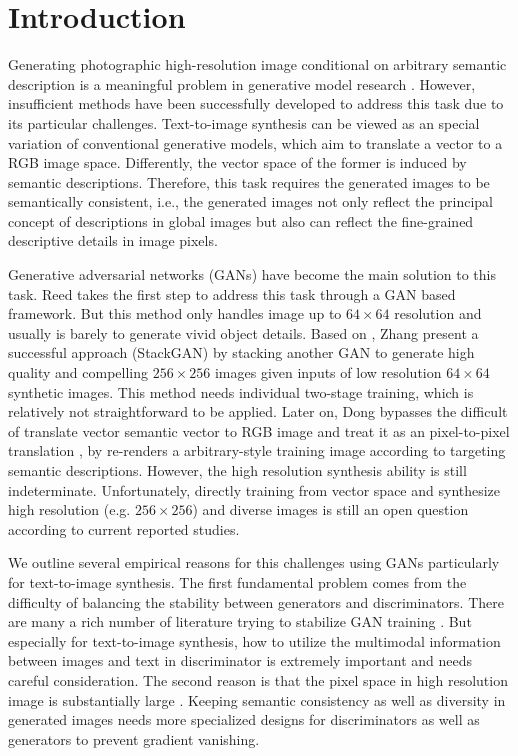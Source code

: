\documentclass[10pt,twocolumn,letterpaper]{article}
\begin{document}
\section{Introduction}
Generating photographic high-resolution image conditional on arbitrary semantic description is a meaningful problem in generative model research \cite{reed2016generative}. However, insufficient methods have been successfully developed to address this task due to its particular challenges. Text-to-image synthesis can be viewed as an special variation of conventional generative models, which aim to translate a vector to a RGB image space.  Differently, the vector space of the former is induced by semantic descriptions. Therefore, this task requires the generated images to be semantically consistent, i.e., the generated images not only reflect the principal concept of descriptions in global images but also can reflect the fine-grained descriptive details in image pixels. 

Generative adversarial networks (GANs) have become the main solution to this task. 
Reed \etal \cite{reed2016generative} takes the first step to address this task through a GAN based framework. But this method only handles image up to $64{\times}64$ resolution and usually is barely to generate vivid object details.
Based on \cite{reed2016generative}, Zhang \etal \cite{han2017stackgan} present a successful approach (StackGAN) by stacking another GAN to generate high quality and compelling $256{\times}256$ images given inputs of low resolution $64{\times}64$ synthetic images. This method needs individual two-stage training, which is relatively not straightforward to be applied. Later on, Dong \etal \cite{dong2017semantic} 
bypasses the difficult of translate vector semantic vector to RGB image and treat it as an pixel-to-pixel translation \cite{isola2016image}, by re-renders a arbitrary-style training image according to targeting semantic descriptions. However, the high resolution synthesis ability is still indeterminate. 
Unfortunately, directly training from vector space and synthesize high resolution (e.g. $256{\times}256$) and diverse images is still an open question according to current reported studies. 

We outline several empirical reasons for this challenges using GANs particularly for text-to-image synthesis. The first fundamental problem comes from the difficulty of balancing the stability between generators and discriminators. There are many a rich number of literature trying to stabilize GAN training \cite{salimans2016improved}. But especially for text-to-image synthesis, how to utilize the multimodal information between images and text in discriminator is extremely important and needs careful consideration. The second reason is that the pixel space in high resolution image is substantially large \cite{han2017stackgan}. Keeping semantic consistency as well as diversity in generated images needs more specialized designs for discriminators as well as generators to prevent gradient vanishing. 
\end{document}
